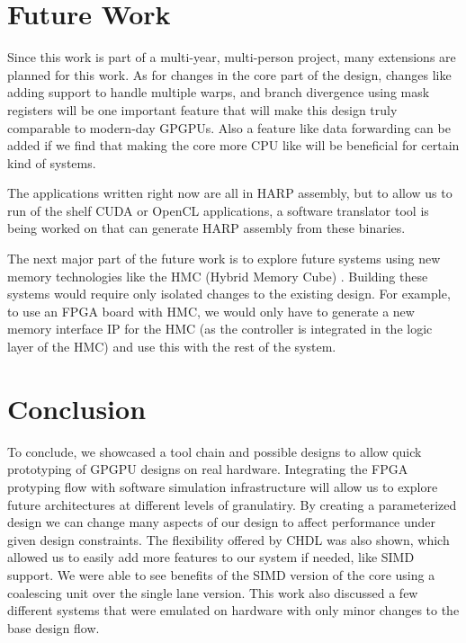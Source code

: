 \section{Future Work}
Since this work is part of a multi-year, multi-person project, many extensions are planned for this work. As for changes in the core part of the design, changes like adding support to handle multiple warps, and branch divergence using mask registers will be one important feature that will make this design truly comparable to modern-day GPGPUs. Also a feature like data forwarding can be added if we find that making the core more CPU like will be beneficial for certain kind of systems.

The applications written right now are all in HARP assembly, but to allow us to run of the shelf CUDA or OpenCL applications, a software translator tool is being worked on that can generate HARP assembly from these binaries.

The next major part of the future work is to explore future systems using new memory technologies like the HMC (Hybrid Memory Cube) \cite{hmc}. Building these systems would require only isolated changes to the existing design. For example, to use an FPGA board with HMC, we would only have to generate a new memory interface IP for the HMC (as the controller is integrated in the logic layer of the HMC) and use this with the rest of the system.

\section{Conclusion}
To conclude, we showcased a tool chain and possible designs to allow quick prototyping of GPGPU designs on real hardware. Integrating the FPGA protyping flow with software simulation infrastructure will allow us to explore future architectures at different levels of granulatiry. By creating a parameterized design we can change many aspects of our design to affect performance under given design constraints. The flexibility offered by CHDL was also shown, which allowed us to easily add more features to our system if needed, like SIMD support. We were able to see benefits of the SIMD version of the core using a coalescing unit over the single lane version. This work also discussed a few different systems that were emulated on hardware with only minor changes to the base design flow. 
